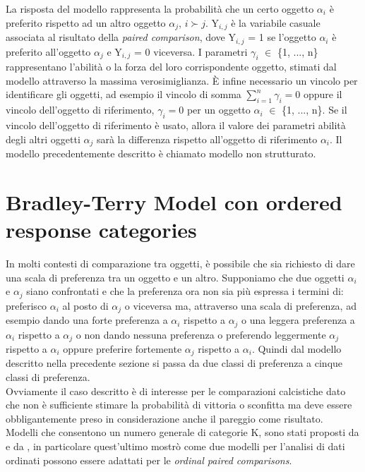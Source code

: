 La risposta del modello rappresenta la probabilità che un certo oggetto $\alpha_{i}$ è preferito rispetto ad un altro oggetto $\alpha_{j}$, $i \succ j$.
Y$_{i,j}$ è la variabile casuale associata al risultato della \emph{paired comparison}, dove Y$_{i,j}$ = 1 se l'oggetto $\alpha_{i}$ è preferito all'oggetto $\alpha_{j}$ e Y$_{i,j}$ = 0 viceversa. I parametri $\gamma_{i}$ $\in$ \{1, ..., n\} rappresentano l'abilità o la forza del loro corrispondente oggetto, stimati dal modello attraverso la massima verosimiglianza. È infine necessario un vincolo per identificare gli oggetti, ad esempio il vincolo di somma $ \sum_{i=1}^{n} \gamma_{i} = 0 $ oppure il vincolo dell'oggetto di riferimento, $\gamma_{i} = 0$ per un oggetto $\alpha_{i}$ $\in$ \{1, ..., n\}. Se il vincolo dell'oggetto di riferimento è usato, allora il valore dei parametri abilità degli altri oggetti $\alpha_{j}$ sarà la differenza rispetto all'oggetto di riferimento $\alpha_{i}$.
Il modello precedentemente descritto è chiamato modello non strutturato.\\


\section{Bradley-Terry Model con ordered response categories}	
In molti contesti di comparazione tra oggetti, è possibile che sia richiesto di dare una scala di preferenza tra un oggetto e un altro. Supponiamo che due oggetti $\alpha_{i}$ e $\alpha_{j}$ siano confrontati e che la preferenza ora non sia più espressa i termini di: preferisco $\alpha_{i}$ al posto di $\alpha_{j}$ o viceversa ma, attraverso una scala di preferenza, ad esempio dando una forte preferenza a $\alpha_{i}$ rispetto a $\alpha_{j}$ o una leggera preferenza a $\alpha_{i}$ rispetto a $\alpha_{j}$ o non dando nessuna preferenza o preferendo leggermente $\alpha_{j}$ rispetto a $\alpha_{i}$ oppure preferire fortemente $\alpha_{j}$ rispetto a $\alpha_{i}$. Quindi dal modello descritto nella precedente sezione si passa da due classi di preferenza a cinque classi di preferenza.\\
Ovviamente il caso descritto è di interesse per le comparazioni calcistiche dato che non è sufficiente stimare la probabilità di vittoria o sconfitta ma deve essere obbligantemente preso in considerazione anche il pareggio come risultato.\\

Modelli che consentono un numero generale di categorie K, sono stati proposti da \autocite{tutz1986bradley} e da \autocite{bradley1952rank}, in particolare quest'ultimo mostrò come due modelli per l'analisi di dati ordinati possono essere adattati per le \emph{ordinal paired comparisons}.\\

